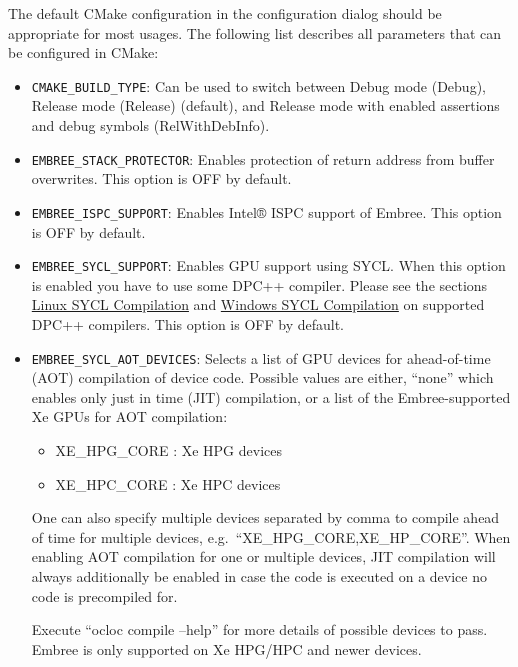 The default CMake configuration in the configuration dialog should be
appropriate for most usages. The following list describes all parameters
that can be configured in CMake:

\begin{itemize}
\item
  \texttt{CMAKE\_BUILD\_TYPE}: Can be used to switch between Debug mode
  (Debug), Release mode (Release) (default), and Release mode with
  enabled assertions and debug symbols (RelWithDebInfo).
\item
  \texttt{EMBREE\_STACK\_PROTECTOR}: Enables protection of return
  address from buffer overwrites. This option is OFF by default.
\item
  \texttt{EMBREE\_ISPC\_SUPPORT}: Enables Intel® ISPC support of Embree.
  This option is OFF by default.
\item
  \texttt{EMBREE\_SYCL\_SUPPORT}: Enables GPU support using SYCL. When
  this option is enabled you have to use some DPC++ compiler. Please see
  the sections \hyperref[linux-sycl-compilation]{Linux SYCL Compilation}
  and \hyperref[windows-sycl-compilation]{Windows SYCL Compilation} on
  supported DPC++ compilers. This option is OFF by default.
\item
  \texttt{EMBREE\_SYCL\_AOT\_DEVICES}: Selects a list of GPU devices for
  ahead-of-time (AOT) compilation of device code. Possible values are
  either, ``none'' which enables only just in time (JIT) compilation, or
  a list of the Embree-supported Xe GPUs for AOT compilation:

  \begin{itemize}
  \tightlist
  \item
    XE\_HPG\_CORE : Xe HPG devices
  \item
    XE\_HPC\_CORE : Xe HPC devices
  \end{itemize}

  One can also specify multiple devices separated by comma to compile
  ahead of time for multiple devices,
  e.g.~``XE\_HPG\_CORE,XE\_HP\_CORE''. When enabling AOT compilation for
  one or multiple devices, JIT compilation will always additionally be
  enabled in case the code is executed on a device no code is
  precompiled for.

  Execute ``ocloc compile --help'' for more details of possible devices
  to pass. Embree is only supported on Xe HPG/HPC and newer devices.


\end{itemize}

